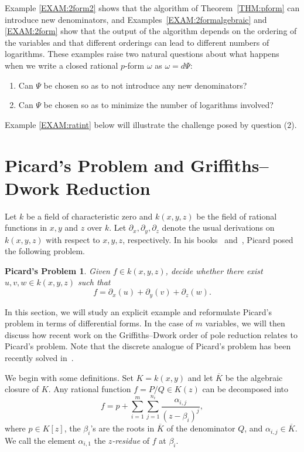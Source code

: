 \documentclass{amsart}
\newtheorem*{PP}{Picard's Problem}
\theoremstyle{definition}
\numberwithin{equation}{section}
\numberwithin{thm}{section}
\begin{document}
Example \ref{EXAM:2form2} shows that the algorithm of Theorem~\ref{THM:pform} can introduce new denominators, and Examples~\ref{EXAM:2formalgebraic} and  \ref{EXAM:2form} show that the output of the algorithm depends on the ordering of the variables and that different orderings can lead to different numbers of logarithms.  These examples raise two natural questions about what happens when we write a closed rational $p$-form $\omega$ as $\omega = d\Psi$:
\begin{enumerate}
    \item Can $\Psi$ be chosen so as to not introduce any new denominators?
    \item Can $\Psi$ be chosen so as to minimize the number of logarithms involved?
\end{enumerate}
Example \ref{EXAM:ratint} below will illustrate the challenge posed by question (2).

\section{Picard's Problem and Griffiths--Dwork Reduction}
\label{SECT:Picard}

Let $k$ be a field of characteristic zero and $k(x, y, z)$ be the field of rational functions in $x, y$ and $z$ over $k$. Let $\partial_x, \partial_y, \partial_z$ denote the usual derivations on $k(x, y, z)$ with respect to $x, y, z$, respectively. In his books~\cite[Vol.\ II, pp.~475--479]{picard1897} and~\cite[pp.~209--215]{picard1931}, Picard posed the following problem.

\begin{PP}
 Given $f\in k(x, y, z)$, decide whether there exist $u, v, w \in k(x, y, z)$ such that
\begin{equation}\label{EQ:Picard}
f = \partial_x(u) + \partial_y(v) + \partial_z(w).
\end{equation}
\end{PP}

In this section, we will study an explicit example and reformulate Picard's problem in terms of differential forms. In the case of $m$ variables, we will then discuss how recent work on  the 
Griffiths--Dwork order of pole reduction relates to Picard's problem. Note that the discrete analogue of Picard's problem has been recently solved in~\cite{ChenDuFang2025}.

We begin with some definitions.
Set $K=k(x, y)$ and let $\overline{K}$ be the algebraic closure of $K$. Any rational function $f=P/Q \in K(z)$ can be decomposed into
\[
  f = p + \sum_{i=1}^m \sum_{j=1}^{n_i}\frac{\alpha_{i,j}}{(z-\beta_i)^j},
\]
where $p\in {K}[z]$, the $\beta_i$'s are the roots in $\overline{K}$ of the denominator $Q$, and $\alpha_{i,j}\in \overline{K}$. We call the element $\alpha_{i,1}$ the \textit{$z$-residue} of $f$ at $\beta_i$.
\end{document}
